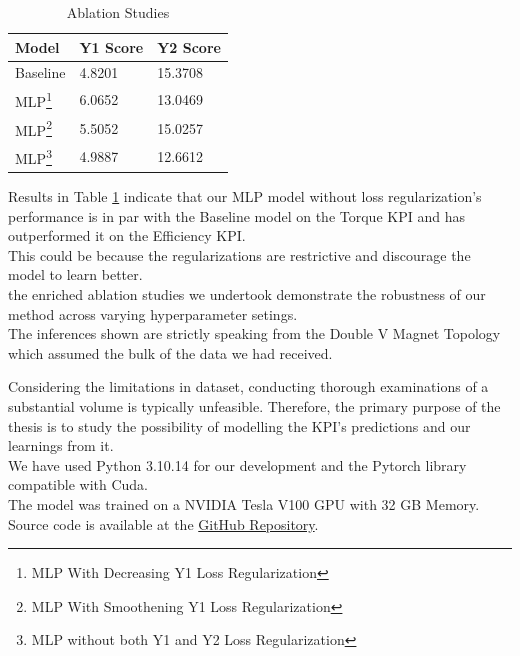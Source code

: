 \documentclass{report} %
\begin{document}
\begin{minipage}[t]{\textwidth}
    \begin{table}[H]
        \centering
        \begin{tabular}{|p{}|p{}|p{}|}
        \hline {\bf Model} & {\bf Y1 Score} & {\bf Y2 Score}\\
        \hline 
        Baseline & 4.8201 & 15.3708 \\
        MLP\footnote{MLP With Decreasing Y1 Loss Regularization} & 6.0652 & 13.0469 \\
        MLP\footnote{MLP With Smoothening Y1 Loss Regularization} & 5.5052 & 15.0257 \\
        MLP\footnote{MLP without both Y1 and Y2 Loss Regularization} & 4.9887 & 12.6612  \\
        \hline
        \end{tabular}
        \caption{Ablation Studies}
        \label{tab:Ablation Studies}
    \end{table}
\end{minipage}

\vspace{1em} %

Results in Table \ref{tab:Ablation Studies} indicate that our \ac{MLP} model without loss regularization's performance is in par with the Baseline model on the Torque \ac{KPI} and has outperformed it on the Efficiency \ac{KPI}.\\
This could be because the regularizations are restrictive and discourage the model to learn better.\\
the enriched ablation studies we undertook demonstrate the robustness of our method across varying hyperparameter setings.\\
The inferences shown are strictly speaking from the Double V Magnet Topology which assumed the bulk of the data we had received.

Considering the limitations in dataset, conducting thorough examinations of a substantial volume is typically unfeasible. Therefore, the primary purpose of the thesis is to study the possibility of modelling the \ac{KPI}'s predictions and our learnings from it.\\

We have used Python 3.10.14 for our development and the Pytorch library compatible with Cuda.\\
The model was trained on a NVIDIA Tesla V100 \ac{GPU} with 32 GB Memory.\\
Source code is available at the \href{https://github.com/Lilly-25/Masters-Thesis}{GitHub Repository}.
\end{document}

